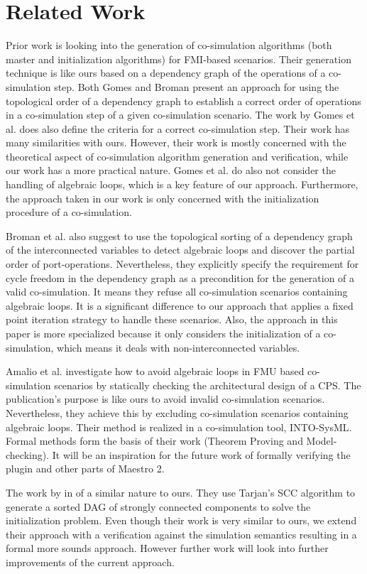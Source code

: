 \section{Related Work}
Prior work \cite{Gomes2019, BromanCompositionCo-Simulation} is looking into the generation of co-simulation algorithms (both master and initialization algorithms) for FMI-based scenarios. Their generation technique is like ours based on a dependency graph of the operations of a co-simulation step. Both Gomes and Broman present an approach for using the topological order of a dependency graph to establish a correct order of operations in a co-simulation step of a given co-simulation scenario.
The work by Gomes et al. \cite{Gomes2019} does also define the criteria for a correct co-simulation step. Their work has many similarities with ours. However, their work is mostly concerned with the theoretical aspect of co-simulation algorithm generation and verification, while our work has a more practical nature. Gomes et al. do also not consider the handling of algebraic loops, which is a key feature of our approach. Furthermore, the approach taken in our work is only concerned with the initialization procedure of a co-simulation.

Broman et al. \cite{BromanCompositionCo-Simulation} also suggest to use the topological sorting of a dependency graph of the interconnected variables to detect algebraic loops and discover the partial order of port-operations. Nevertheless, they explicitly specify the requirement for cycle freedom in the dependency graph as a precondition for the generation of a valid co-simulation. It means they refuse all co-simulation scenarios containing algebraic loops. It is a significant difference to our approach that applies a fixed point iteration strategy to handle these scenarios. Also, the approach in this paper is more specialized because it only considers the initialization of a co-simulation, which means it deals with non-interconnected variables.

Amalio et al. \cite{Amalio2016CheckingCo-simulation} investigate how to avoid algebraic loops in FMU based co-simulation scenarios by statically checking the architectural design of a CPS. The publication's purpose is like ours to avoid invalid co-simulation scenarios. Nevertheless, they achieve this by excluding co-simulation scenarios containing algebraic loops. Their method is realized in a co-simulation tool, INTO-SysML\cite{Miyazawa2016INtegratedModelling}. Formal methods form the basis of their work (Theorem Proving and Model-checking). It will be an inspiration for the future work of formally verifying the plugin and other parts of Maestro 2. 

The work by \cite{EvoraGomez2019a} in of a similar nature to ours. They use Tarjan’s SCC algorithm to generate a sorted DAG of strongly connected components to solve the initialization problem.
Even though their work is very similar to ours, we extend their approach with a verification against the simulation semantics resulting in a formal more sounds approach. However further work will look into further improvements of the current approach.